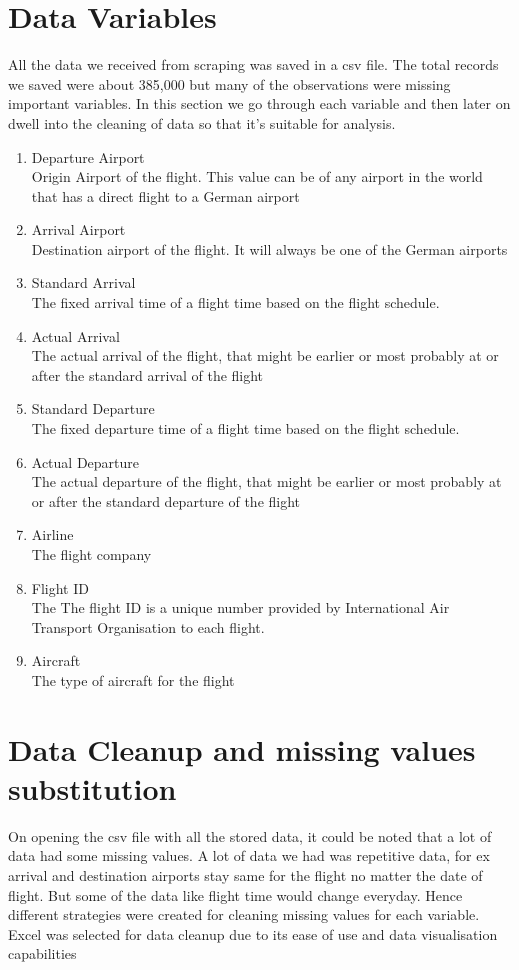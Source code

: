 \section{Data Variables}
All the data we received from scraping was saved in a csv file.
The total records we saved were about 385,000 but many of the observations were missing important variables. In this section we go through each variable and then later on dwell into the cleaning of data so that it's suitable for analysis.
\begin{enumerate}
    \item {Departure Airport}
    \\Origin Airport of the flight. This value can be of any airport in the world that has a direct flight to a German airport
    \item {Arrival Airport}
    \\Destination airport of the flight. It will always be one of the German airports
    \item {Standard Arrival}
    \\The fixed arrival time of a flight time based on the flight schedule.
    \item {Actual Arrival}
    \\The actual arrival of the flight, that might be earlier or most probably at or after the standard arrival of the flight
    \item {Standard Departure}
    \\The fixed departure time of a flight time based on the flight schedule.
    \item {Actual Departure}
    \\The actual departure of the flight, that might be earlier or most probably at or after the standard departure of the flight
    \item {Airline}
    \\The flight company
    \item {Flight ID}
    \\The The flight ID is a unique number provided by International Air Transport Organisation to each flight.
    \item {Aircraft}
    \\The type of aircraft for the flight
\end{enumerate}

\section{Data Cleanup and missing values substitution}
On opening the csv file with all the stored data, it could be noted that a lot of data had some missing values. A lot of data we had was  repetitive data, for ex arrival and destination airports stay same for the flight no matter the date of flight. But some of the data like flight time would change everyday. Hence different strategies were created for cleaning missing values for each variable.
Excel was selected for data cleanup due to its ease of use and data visualisation capabilities

